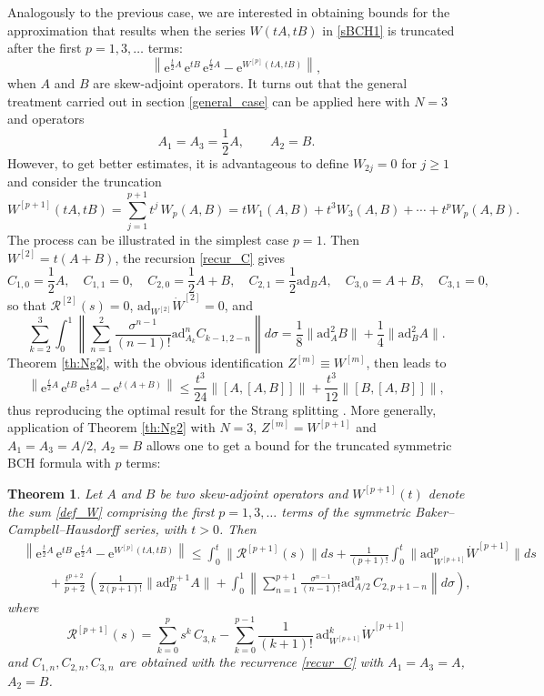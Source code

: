 \documentclass[11pt]{article}
\newcommand{\e}{\ensuremath{\mathrm{e}}}
\newcommand{\ad}{\ensuremath{\mathrm{ad}}}
\newtheorem{theorem}{Theorem}[section]
\begin{document}
Analogously to the previous case, we are interested in obtaining bounds for the approximation that results when the series $W(tA,tB)$ in \eqref{sBCH1}
is truncated after the first $p=1,3,\ldots$ terms:
\[
   \left\| \e^{\frac{t}{2} A} \, \e^{t B} \,  \e^{\frac{t}{2} A} - \e^{W^{[p]}(tA,tB)} \right\|, 
\]   
when $A$ and $B$ are skew-adjoint operators.
It turns out that the general treatment carried out in section \ref{general_case} can be applied here with $N=3$ and operators
\[
  A_1 = A_3 = \frac{1}{2} A, \qquad A_2 = B.
\]  
However, to get better estimates,  it is advantageous to define $W_{2j} = 0$ for $j \ge 1$ and consider the truncation
\begin{equation} \label{def_W}
  W^{[p+1]}(tA,tB)= \sum_{j=1}^{p+1} t^j \, W_p(A,B) = t W_1(A,B) + t^3 W_3(A,B) + \cdots + t^p W_p(A,B).
\end{equation}  
The process can be illustrated in the simplest case $p=1$. Then
$W^{[2]} = t(A+B)$, the recursion \eqref{recur_C} gives
\[
  C_{1,0} = \frac{1}{2} A, \quad C_{1,1} = 0, \quad C_{2,0} = \frac{1}{2} A + B, \quad C_{2,1} = \frac{1}{2}\ad_B A, \quad C_{3,0} = A + B, \quad C_{3,1} = 0,
\]
so that $\mathcal{R}^{[2]}(s) = 0$, $\ad_{W^{[2]}} \dot{W}^{[2]} = 0$, and
\[
  \sum_{k=2}^3 \int_0^1 \left\| \sum_{n=1}^2 \frac{\sigma^{n-1}}{(n-1)!} \ad_{A_k}^n C_{k-1,2-n} \right\| d\sigma = 
  \frac{1}{8} \| \ad_A^2 B \| + \frac{1}{4} \|\ad_B^2 A\|. 
\]
Theorem \ref{th:Ng2}, with the obvious identification $Z^{[m]} \equiv W^{[m]}$, then leads to   
\[
  \left\| \e^{\frac{t}{2} A} \, \e^{t B} \,  \e^{\frac{t}{2} A} - \e^{t(A+B)} \right\| \le  \frac{t^3}{24} \|[A,[A,B]]\| + \frac{t^3}{12} \|[B,[A,B]]\|,
\]
thus reproducing the optimal result for the Strang splitting \cite{suzuki85dfo,childs21tot,iserles24aea}. More generally,
application of Theorem \ref{th:Ng2} with $N=3$, $Z^{[m]} = W^{[p+1]}$ and 
$A_1 = A_3 = A/2$, $A_2 = B$ allows one to get a  bound for the truncated symmetric BCH formula with $p$ terms:

\begin{theorem}\label{th:sym} 
Let $A$ and $B$ be two skew-adjoint operators and $W^{[p+1]}(t)$ denote the sum \eqref{def_W} comprising the first $p=1,3,\ldots$ 
terms of the symmetric Baker--Campbell--Hausdorff series, with $t > 0$. Then
\[
\begin{aligned}
  &   \left\| \e^{\frac{t}{2} A} \, \e^{t B} \,  \e^{\frac{t}{2} A} - \e^{W^{[p]}(tA,tB)} \right\|  \le \int_0^t \|  \mathcal{R}^{[p+1]}(s) \| ds + 
    \frac{1}{(p+1)!} \int_0^t \|\ad_{W^{[p+1]}}^{p} \dot{W}^{[p+1]} \| ds  \\
    & \qquad + \frac{t^{p+2}}{p+2} \, \left( \frac{1}{2 (p+1)!} \| \ad_B^{p+1} A\| + \int_0^1 \left\| \sum_{n=1}^{p+1} \frac{\sigma^{n-1}}{(n-1)!} 
    \ad_{A/2}^n  \, C_{2,p+1-n} \right\| d\sigma \right),
\end{aligned}   
\]
where
\[
      \mathcal{R}^{[p+1]}(s) =  \sum_{k=0}^{p} s^k \, C_{3,k} - \sum_{k=0}^{p-1} \frac{1}{(k+1)!} \, \ad_{W^{[p+1]}}^k \dot{W}^{[p+1]}
\]
and $C_{1,n}, C_{2,n}, C_{3,n}$ are obtained with the recurrence \eqref{recur_C} with $A_1=A_3=A$, $A_2=B$.
 \end{theorem}   
\end{document}
